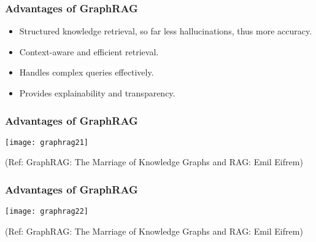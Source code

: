 


\begin{frame}[fragile]\frametitle{Advantages of GraphRAG}
    \begin{itemize}
        \item Structured knowledge retrieval, so far less hallucinations, thus more accuracy.
        \item Context-aware and efficient retrieval.
        \item Handles complex queries effectively.
        \item Provides explainability and transparency.
    \end{itemize}
\end{frame}


\begin{frame}[fragile]\frametitle{Advantages of GraphRAG}

	\begin{center}
	\texttt{[image: graphrag21]}
	\end{center}
	
	{\tiny (Ref: GraphRAG: The Marriage of Knowledge Graphs and RAG: Emil Eifrem)}

	
\end{frame}

\begin{frame}[fragile]\frametitle{Advantages of GraphRAG}

	\begin{center}
	\texttt{[image: graphrag22]}
	\end{center}
	
	{\tiny (Ref: GraphRAG: The Marriage of Knowledge Graphs and RAG: Emil Eifrem)}

	
\end{frame}

